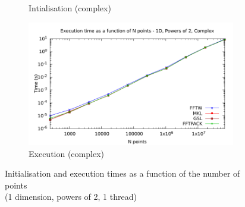\documentclass[12pt, a4paper]{article}
\begin{document}
\begin{figure}[H]
\begin{subfigure}{.5\textwidth}
\caption{Intialisation (complex)}
\label{1DPOW2CI}
\end{subfigure}%
\begin{subfigure}{.5\textwidth}
\centering
\includegraphics[width=.9\linewidth]{graphs/1d-pow2-exec-c.pdf}
\caption{Execution (complex)}
\label{1DPOW2C}
\end{subfigure}
\caption{Initialisation and execution times as a function of the number of points\\(1 dimension, powers of 2, 1 thread)}
\label{1DPOW2}
\end{figure}
\end{document}
